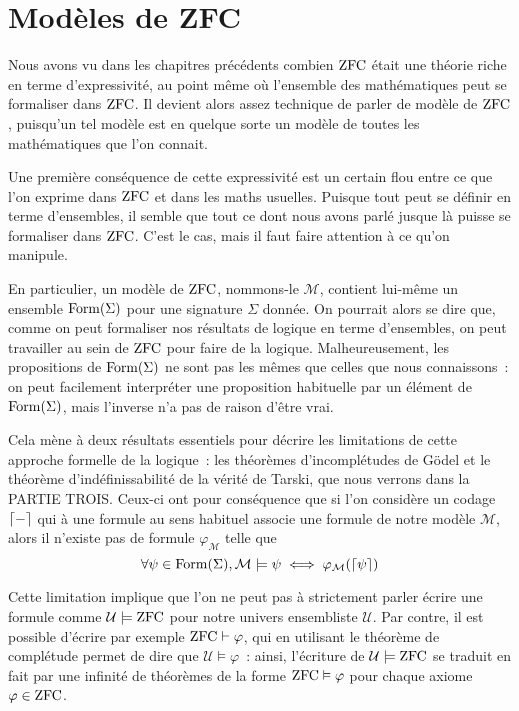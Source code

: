\chapter{Modèles de ZFC}
\label{chp.modZFC}

\minitoc

Nous avons vu dans les chapitres précédents combien $\operatorname{ZFC}$ était une théorie
riche en terme d'expressivité, au point même où l'ensemble des mathématiques
peut se formaliser dans $\operatorname{ZFC}$. Il devient alors assez technique de parler de
modèle de $\operatorname{ZFC}$, puisqu'un tel modèle est en quelque sorte un modèle de toutes
les mathématiques que l'on connait.

Une première conséquence de cette expressivité est un certain flou entre ce que
l'on exprime dans $\operatorname{ZFC}$ et dans les maths usuelles. Puisque tout peut se
définir en terme d'ensembles, il semble que tout ce dont nous avons parlé jusque
là puisse se formaliser dans $\operatorname{ZFC}$. C'est le cas, mais il faut faire attention
à ce qu'on manipule.

En particulier, un modèle de $\operatorname{ZFC}$, nommons-le $\mathcal M$, contient lui-même
un ensemble $\operatorname{Form}(\Sigma)$ pour une signature $\Sigma$ donnée. On pourrait
alors se dire que, comme on peut formaliser nos résultats de logique en terme
d'ensembles, on peut travailler au sein de $\operatorname{ZFC}$ pour faire de la logique.
Malheureusement, les propositions de $\operatorname{Form}(\Sigma)$ ne sont pas les mêmes
que celles que nous connaissons~: on peut facilement interpréter une proposition
habituelle par un élément de $\operatorname{Form}(\Sigma)$, mais l'inverse n'a pas de
raison d'être vrai.

Cela mène à deux résultats essentiels pour décrire les limitations de cette
approche formelle de la logique~: les théorèmes d'incomplétudes de Gödel et le
théorème d'indéfinissabilité de la vérité de Tarski, que nous verrons dans la
PARTIE TROIS. Ceux-ci ont pour conséquence que si l'on considère un codage
$\lceil-\rceil$ qui à une formule au sens habituel associe une formule de notre
modèle $\mathcal M$, alors il n'existe pas de formule $\varphi_{\mathcal M}$
telle que
\[\forall \psi \in \operatorname{Form}(\Sigma), \mathcal M \models \psi
\iff \mathcal \varphi_{\mathcal M}(\lceil\psi\rceil)\]

Cette limitation implique que l'on ne peut pas à strictement
parler écrire une formule comme $\mathcal U\models \operatorname{ZFC}$ pour notre univers
ensembliste $\mathcal U$. Par contre, il est possible d'écrire par exemple
$\operatorname{ZFC}\vdash \varphi$, qui en utilisant le théorème de complétude permet de dire
que $\mathcal U \models \varphi$~: ainsi, l'écriture de $\mathcal U\models\operatorname{ZFC}$
se traduit en fait par une infinité de théorèmes de la forme
$\operatorname{ZFC}\vDash \varphi$ pour chaque axiome $\varphi \in \operatorname{ZFC}$.

